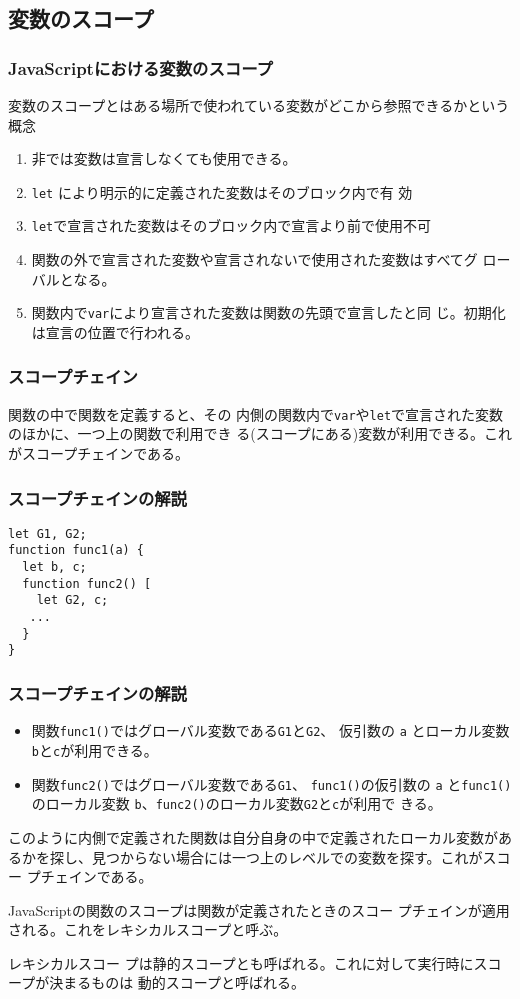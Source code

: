 \subsection{変数のスコープ}
\begin{frame}[containsverbatim]
\frametitle{JavaScriptにおける変数のスコープ}
変数のスコープとはある場所で使われている変数がどこから参照できるかという
概念
\begin{enumerate}
 \item 非\Strict では変数は宣言しなくても使用できる。\label{3-4NoDeclare}
 \item \Verb+let+ により明示的に定義された変数はそのブロック内で有
       効\label{3-4DeclareInFunc}
 \item \Verb+let+で宣言された変数はそのブロック内で宣言より前で使用不可
       \label{3-4DeclareInFunc2}
 \item 関数の外で宣言された変数や宣言されないで使用された変数はすべてグ
       ローバルとなる。\label{3-4Declare2}
 \item 関数内で\Verb+var+により宣言された変数は関数の先頭で宣言したと同
       じ。初期化は宣言の位置で行われる。
\end{enumerate}
\end{frame}
\begin{frame}[containsverbatim]
\frametitle{スコープチェイン}
関数の中で関数を定義すると、その
内側の関数内で\Verb+var+や\Verb+let+で宣言された変数のほかに、一つ上の関数で利用でき
る(スコープにある)変数が利用できる。これがスコープチェインである。
\end{frame}
\begin{frame}[containsverbatim]
\frametitle{スコープチェインの解説}
\begin{Verbatim}
let G1, G2;
function func1(a) {
  let b, c;
  function func2() [
    let G2, c;
   ...
  }
}
\end{Verbatim}
\end{frame}
\begin{frame}[containsverbatim]
\frametitle{スコープチェインの解説}
\begin{itemize}
 \item 関数\Verb+func1()+ではグローバル変数である\Verb+G1+と\Verb+G2+、
       仮引数の \Verb+a+ とローカル変数\Verb+b+と\Verb+c+が利用できる。
 \item 関数\Verb+func2()+ではグローバル変数である\Verb+G1+、
       \Verb+func1()+の仮引数の \Verb+a+ と\Verb+func1()+のローカル変数
       \Verb+b+、\Verb+func2()+のローカル変数\Verb+G2+と\Verb+c+が利用で
       きる。
\end{itemize}
このように内側で定義された関数は自分自身の中で定義されたローカル変数があ
るかを探し、見つからない場合には一つ上のレベルでの変数を探す。これがスコー
プチェインである。

JavaScriptの関数のスコープは関数が定義されたときのスコー
プチェインが適用される。これをレキシカルスコープと呼ぶ。

レキシカルスコー
プは静的スコープとも呼ばれる。これに対して実行時にスコープが決まるものは
動的スコープと呼ばれる。
\end{frame}
